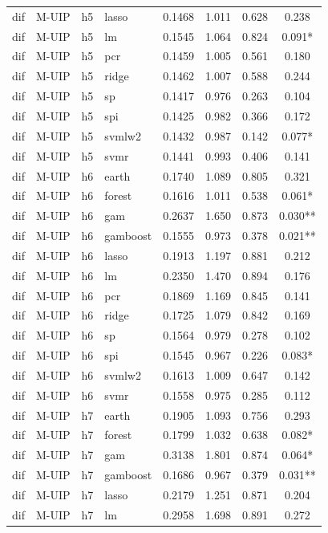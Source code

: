 \begin{ThreePartTable}
\begin{longtable}[t]{llclcccc}
dif & M-UIP & h5 & lasso & 0.1468 & 1.011 & 0.628 & 0.238\\
dif & M-UIP & h5 & lm & 0.1545 & 1.064 & 0.824 & 0.091*\\
dif & M-UIP & h5 & pcr & 0.1459 & 1.005 & 0.561 & 0.180\\
dif & M-UIP & h5 & ridge & 0.1462 & 1.007 & 0.588 & 0.244\\
dif & M-UIP & h5 & sp & 0.1417 & 0.976 & 0.263 & 0.104\\
dif & M-UIP & h5 & spi & 0.1425 & 0.982 & 0.366 & 0.172\\
dif & M-UIP & h5 & svmlw2 & 0.1432 & 0.987 & 0.142 & 0.077*\\
dif & M-UIP & h5 & svmr & 0.1441 & 0.993 & 0.406 & 0.141\\
\addlinespace
dif & M-UIP & h6 & earth & 0.1740 & 1.089 & 0.805 & 0.321\\
dif & M-UIP & h6 & forest & 0.1616 & 1.011 & 0.538 & 0.061*\\
dif & M-UIP & h6 & gam & 0.2637 & 1.650 & 0.873 & 0.030**\\
dif & M-UIP & h6 & gamboost & 0.1555 & 0.973 & 0.378 & 0.021**\\
dif & M-UIP & h6 & lasso & 0.1913 & 1.197 & 0.881 & 0.212\\
dif & M-UIP & h6 & lm & 0.2350 & 1.470 & 0.894 & 0.176\\
dif & M-UIP & h6 & pcr & 0.1869 & 1.169 & 0.845 & 0.141\\
dif & M-UIP & h6 & ridge & 0.1725 & 1.079 & 0.842 & 0.169\\
dif & M-UIP & h6 & sp & 0.1564 & 0.979 & 0.278 & 0.102\\
dif & M-UIP & h6 & spi & 0.1545 & 0.967 & 0.226 & 0.083*\\
dif & M-UIP & h6 & svmlw2 & 0.1613 & 1.009 & 0.647 & 0.142\\
dif & M-UIP & h6 & svmr & 0.1558 & 0.975 & 0.285 & 0.112\\
\addlinespace
dif & M-UIP & h7 & earth & 0.1905 & 1.093 & 0.756 & 0.293\\
dif & M-UIP & h7 & forest & 0.1799 & 1.032 & 0.638 & 0.082*\\
dif & M-UIP & h7 & gam & 0.3138 & 1.801 & 0.874 & 0.064*\\
dif & M-UIP & h7 & gamboost & 0.1686 & 0.967 & 0.379 & 0.031**\\
dif & M-UIP & h7 & lasso & 0.2179 & 1.251 & 0.871 & 0.204\\
dif & M-UIP & h7 & lm & 0.2958 & 1.698 & 0.891 & 0.272\\

\end{longtable}
\end{ThreePartTable}
